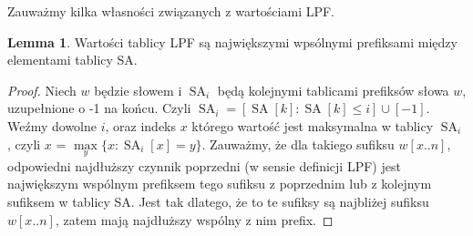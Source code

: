 \documentclass[a4paper,12pt]{article}
\theoremstyle{definition}
\newtheorem{lemma}{Lemma}[section]
\DeclareMathOperator{\SA}{SA}
\begin{document}
\pagebreak



Zauważmy kilka własności związanych z wartościami LPF.

\begin{lemma}

Wartości tablicy LPF są największymi wpsólnymi prefiksami między elementami tablicy SA.

\begin{proof}

Niech $w$ będzie słowem i $\SA_{i}$ będą kolejnymi tablicami prefiksów słowa $w$, uzupełnione o -1 na końcu.
Czyli $\SA_{i} = [ \SA[k] : \SA[k] \leq i ] \cup [-1]$.
Weźmy dowolne $i$, oraz indeks $x$ którego wartość jest maksymalna w tablicy $\SA_{i}$,
 czyli $x$ = $\max\limits_{y} \{ x : \SA_{i}[x] = y \}$.
Zauważmy, że dla takiego sufiksu $w[x .. n]$, odpowiedni najdłuższy czynnik poprzedni (w sensie definicji LPF)
 jest największym wspólnym prefiksem tego sufiksu z poprzednim lub z kolejnym sufiksem w tablicy SA.
Jest tak dlatego, że to te sufiksy są najbliżej sufiksu $w[x .. n]$, zatem mają najdłuższy wspólny z nim prefix.

\end{proof}
\end{lemma}
\end{document}
